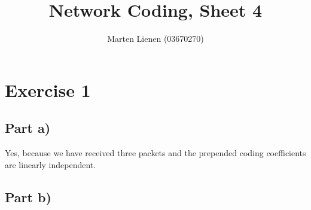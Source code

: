 \documentclass[10pt,a4paper]{article}
\title{Network Coding, Sheet 4}
\author{Marten Lienen (03670270)}
\begin{document}
\maketitle

\section*{Exercise 1}

\subsection*{Part a)}

Yes, because we have received three packets and the prepended coding coefficients are linearly independent.

\subsection*{Part b)}
\end{document}
